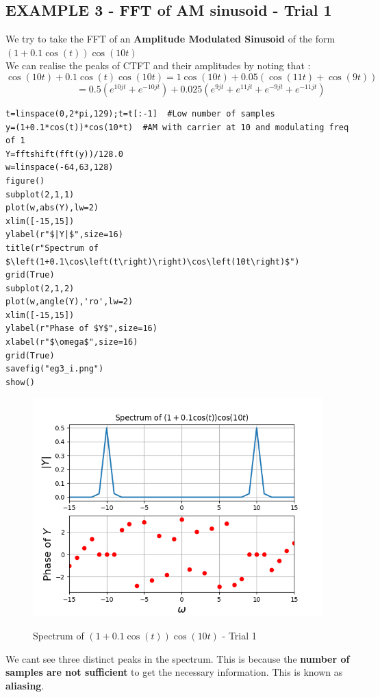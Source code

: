 \documentclass[11pt, a4paper]{article}
\begin{document}
\subsection{EXAMPLE 3 - FFT of AM sinusoid - Trial 1} 
{
We try to take the FFT of an \textbf{Amplitude Modulated Sinusoid} of the form
$\left(1+0.1\cos\left(t\right)\right)\cos\left(10t\right)$
\\We can realise the peaks of CTFT and their amplitudes by noting that :
\[\cos(10t) + 0.1\cos(t)\cos(10t) = 1\cos(10t) + 0.05(\cos(11t) + \cos(9t))\]
\[\hspace{2cm} = 0.5( e^{10jt} + e^{-10jt} ) + 0.025( e^{9jt} + e^{11jt} + e^{-9jt} + e^{-11jt} )\]
}
\begin{verbatim}
t=linspace(0,2*pi,129);t=t[:-1]  #Low number of samples
y=(1+0.1*cos(t))*cos(10*t)  #AM with carrier at 10 and modulating freq of 1
Y=fftshift(fft(y))/128.0
w=linspace(-64,63,128)
figure()
subplot(2,1,1)
plot(w,abs(Y),lw=2)
xlim([-15,15])
ylabel(r"$|Y|$",size=16)
title(r"Spectrum of $\left(1+0.1\cos\left(t\right)\right)\cos\left(10t\right)$")
grid(True)
subplot(2,1,2)
plot(w,angle(Y),'ro',lw=2)
xlim([-15,15])
ylabel(r"Phase of $Y$",size=16)
xlabel(r"$\omega$",size=16)
grid(True)
savefig("eg3_i.png")
show()
\end{verbatim}

\begin{figure}[H]
   	\centering
   	\includegraphics[scale=0.8]{eg3_i.png}
   	\label{fig:eg3_i}
   	\caption{Spectrum of $\left(1+0.1\cos\left(t\right)\right)\cos\left(10t\right)$ - Trial 1}
\end{figure}
{
We cant see three distinct peaks in the spectrum. This is because the \textbf{number of samples are not sufficient} to get the necessary information. This is known as \textbf{aliasing}.
}
\end{document}
